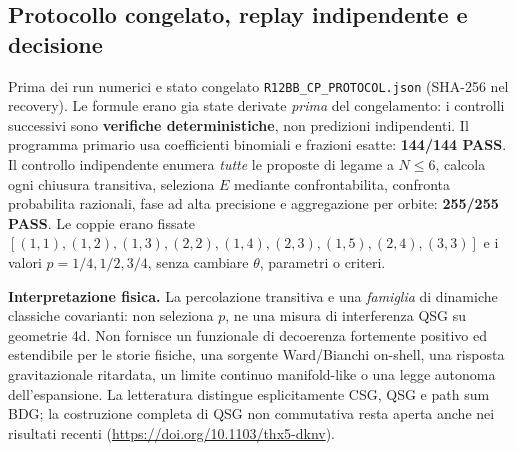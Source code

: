 \documentclass[11pt,a4paper]{article}
\begin{document}
\subsection*{Protocollo congelato, replay indipendente e decisione}
Prima dei run numerici e stato congelato \texttt{R12BB\_CP\_PROTOCOL.json} (SHA-256 nel recovery). Le formule erano gia state derivate \emph{prima} del congelamento: i controlli successivi sono \textbf{verifiche deterministiche}, non predizioni indipendenti. Il programma primario usa coefficienti binomiali e frazioni esatte: \textbf{144/144 PASS}. Il controllo indipendente enumera \emph{tutte} le proposte di legame a $N\le6$, calcola ogni chiusura transitiva, seleziona $E$ mediante confrontabilita, confronta probabilita razionali, fase ad alta precisione e aggregazione per orbite: \textbf{255/255 PASS}. Le coppie erano fissate $[(1,1),(1,2),(1,3),(2,2),(1,4),(2,3),(1,5),(2,4),(3,3)]$ e i valori $p=1/4,1/2,3/4$, senza cambiare $\theta$, parametri o criteri.

\textbf{Interpretazione fisica.} La percolazione transitiva e una \emph{famiglia} di dinamiche classiche covarianti: non seleziona $p$, ne una misura di interferenza QSG su geometrie 4d. Non fornisce un funzionale di decoerenza fortemente positivo ed estendibile per le storie fisiche, una sorgente Ward/Bianchi on-shell, una risposta gravitazionale ritardata, un limite continuo manifold-like o una legge autonoma dell'espansione. La letteratura distingue esplicitamente CSG, QSG e path sum BDG; la costruzione completa di QSG non commutativa resta aperta anche nei risultati recenti (\url{https://doi.org/10.1103/thx5-dknv}).
\end{document}
